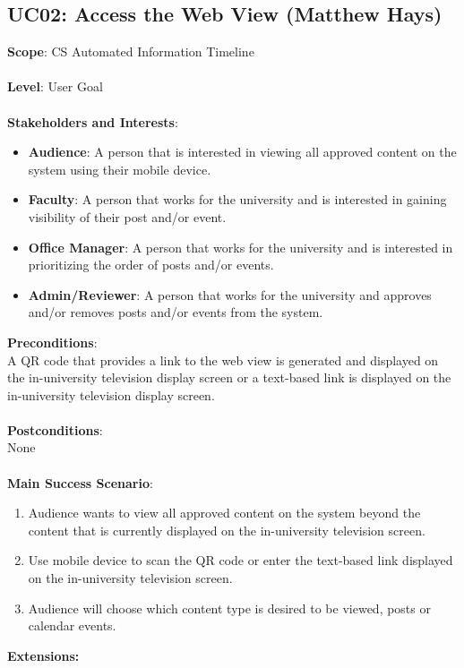 \documentclass{article}
\begin{document}
\subsection{\textbf{UC02}: Access the Web View (Matthew Hays)}
    \textbf{Scope}: CS Automated Information Timeline\\
    \\
        \textbf{Level}: User Goal\\
    \\
    \textbf{Stakeholders and Interests}:
    \begin{itemize}[label={}]
        \item \textbf{Audience}: A person that is interested in viewing all approved content on the system using their mobile device.
         \item \textbf{Faculty}: A person that works for the university and is interested in gaining visibility of their post and/or event.
         \item \textbf{Office Manager}: A person that works for the university and is interested in prioritizing the order of posts and/or events. 
          \item \textbf{Admin/Reviewer}: A person that works for the university and approves and/or removes posts and/or events from the system. 
    \end{itemize}
    \textbf{Preconditions}:\\
    A QR code that provides a link to the web view is generated and displayed on the in-university television display screen or a text-based link is displayed on the in-university television display screen.\\
    \\
    \textbf{Postconditions}:\\
    None \\
    \\
    \textbf{Main Success Scenario}:
    \begin{enumerate}
        \item Audience wants to view all approved content on the system beyond the content that is currently displayed on the in-university television screen. 
        \item Use mobile device to scan the QR code or enter the text-based link displayed on the in-university television screen.
        \item Audience will choose which content type is desired to be viewed, posts or calendar events.
    \end{enumerate}
    \textbf{Extensions:}
\end{document}
